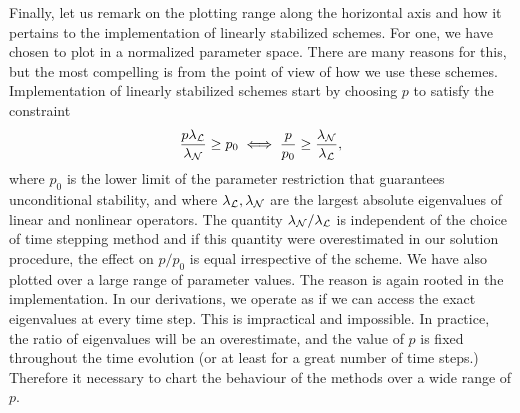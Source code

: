 Finally, let us remark on the plotting range along the horizontal axis and how it pertains to the implementation of linearly stabilized schemes. For one, we have chosen to plot in a normalized parameter space. There are many reasons for this, but the most compelling is from the point of view of how we use these schemes. Implementation of linearly stabilized schemes start by choosing $p$ to satisfy the constraint 
\begin{align}
      \frac{p\lambda_{\mathcal{L}}}{\lambda_{\mathcal{N}}}  \geq p_0 
\iff  \frac{p}{p_0} \geq \frac{\lambda_{\mathcal{N}}}{\lambda_{\mathcal{L}}},
\end{align}
where $p_0$ is the lower limit of the parameter restriction that guarantees unconditional stability, and where $\lambda_{\mathcal{L}}, \lambda_{\mathcal{N}}$ are the largest absolute eigenvalues of linear and nonlinear operators. The quantity $\lambda_{\mathcal{N}}/\lambda_{\mathcal{L}}$ is independent of the choice of time stepping method and if this quantity were overestimated in our solution procedure, the effect on $p/p_0$ is equal irrespective of the scheme. We have also plotted over a large range of parameter values. The reason is again rooted in the implementation. In our derivations, we operate as if we can access the exact eigenvalues at every time step. This is impractical and impossible. In practice, the ratio of eigenvalues will be an overestimate, and the value of $p$ is fixed throughout the time evolution (or at least for a great number of time steps.) Therefore it necessary to chart the behaviour of the methods over a wide range of $p$.
